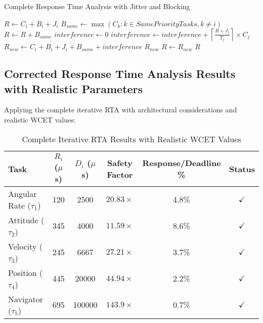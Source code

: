 \documentclass[12pt,a4paper]{article}
\begin{document}
\begin{algorithm}[H]
\caption{Complete Response Time Analysis with Jitter and Blocking}
\begin{algorithmic}[1]
    \State $R \gets C_i + B_i + J_i$
    \State $B_{same} \gets \max(C_k : k \in SamePriorityTasks, k \neq i)$
    \State $R \gets R + B_{same}$
        \State $interference \gets 0$
            \State $interference \gets interference + \left\lceil \frac{R + J_j}{T_j} \right\rceil \times C_j$
        \EndFor
        \State $R_{new} \gets C_i + B_i + J_i + B_{same} + interference$
            \State \Return $R_{new}$
        \EndIf
        \State $R \gets R_{new}$
    \EndFor
    \State \Return $R$ 
\EndFunction
\end{algorithmic}
\end{algorithm}

\subsection{Corrected Response Time Analysis Results with Realistic Parameters}

Applying the complete iterative RTA with architectural considerations and realistic WCET values:

\begin{table}[H]
\centering
\begin{tabular}{|l|c|c|c|c|c|}
\hline
\textbf{Task} & \textbf{$R_i$ ($\mu$s)} & \textbf{$D_i$ ($\mu$s)} & \textbf{Safety Factor} & \textbf{Response/Deadline \%} & \textbf{Status} \\
\hline
Angular Rate ($\tau_1$) & 120 & 2500 & $20.83\times$ & 4.8\% & $\checkmark$ \\
Attitude ($\tau_2$) & 345 & 4000 & $11.59\times$ & 8.6\% & $\checkmark$ \\
Velocity ($\tau_3$) & 245 & 6667 & $27.21\times$ & 3.7\% & $\checkmark$ \\
Position ($\tau_4$) & 445 & 20000 & $44.94\times$ & 2.2\% & $\checkmark$ \\
Navigator ($\tau_5$) & 695 & 100000 & $143.9\times$ & 0.7\% & $\checkmark$ \\
\hline
\end{tabular}
\caption{Complete Iterative RTA Results with Realistic WCET Values}
\end{table}
\end{document}
